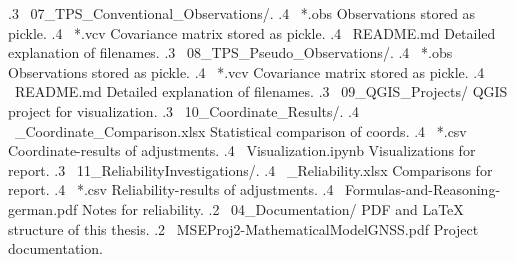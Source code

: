 {	%
	.3 \faFolderOpen ~07\_TPS\_Conventional\_Observations/.
	.4 \faFileArchiveO ~*.obs \dotfill Observations stored as pickle.
	.4 \faFileArchiveO ~*.vcv \dotfill Covariance matrix stored as pickle.
	.4 \faFileText ~README.md \dotfill Detailed explanation of filenames.
	.3 \faFolderOpen ~08\_TPS\_Pseudo\_Observations/.
	.4 \faFileArchiveO ~*.obs \dotfill Observations stored as pickle.
	.4 \faFileArchiveO ~*.vcv \dotfill Covariance matrix stored as pickle.
	.4 \faFileText ~README.md \dotfill Detailed explanation of filenames.
	.3 \faFolderOpen ~09\_QGIS\_Projects/ \dotfill QGIS project for visualization.
	.3 \faFolderOpen ~10\_Coordinate\_Results/.
	.4 \faFileExcelO ~\_Coordinate\_Comparison.xlsx \dotfill Statistical comparison of coords.
	.4 \faFileExcelO ~*.csv \dotfill Coordinate-results of adjustments.
	.4 \faFileCodeO ~Visualization.ipynb \dotfill Visualizations for report.
	.3 \faFolderOpen ~11\_ReliabilityInvestigations/.		
	.4 \faFileExcelO ~\_Reliability.xlsx \dotfill Comparisons for report.
	.4 \faFileExcelO ~*.csv \dotfill Reliability-results of adjustments.
	.4 \faFilePdfO ~Formulas-and-Reasoning-german.pdf \dotfill Notes for reliability.
	.2 \faFolderOpen ~04\_Documentation/ \dotfill PDF and LaTeX structure of this thesis.
	.2 \faFilePdfO ~MSEProj2-MathematicalModelGNSS.pdf \dotfill Project documentation.
}